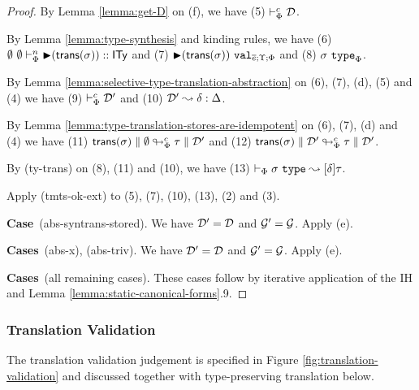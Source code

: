 \documentclass[12pt]{article}
\newcommand{\pfcase}[1]{\textbf{Case}~#1. }
\newcommand{\pfcases}[1]{\textbf{Cases}~#1. }
\begin{document}
\begin{proof}
By Lemma \ref{lemma:get-D} on (f), we have (5) $\tytsvX{\memD}$.

By Lemma \ref{lemma:type-synthesis} and kinding rules, we have (6) $\sofkVX{\sqity{\srep{\st}}}{\kity}$ and (7) $\sval{\sqity{\srep{\st}}}{\es;\Upsilon;\Phi}$ and (8) $\istype{\st}{\Phi}$.

By Lemma \ref{lemma:selective-type-translation-abstraction} on (6), (7), (d), (5) and (4) we have (9) $\tytsvX{\memD'}$ and (10) $\memD' \leadsto \delta : \Delta$.

By Lemma \ref{lemma:type-translation-stores-are-idempotent} on (6), (7), (d) and (4) we have (11) $\tdeabs{\Phi}{c}{\srep{\st}}{\emptyset}{\tau}{\memD'}$ and (12) $\tdeabs{\Phi}{c}{\srep{\st}}{\memD'}{\tau}{\memD'}$.

By (ty-trans) on (8), (11) and (10), we have (13) $\tytransX{\st}{[\delta]\tau}$.

Apply (tmts-ok-ext) to (5), (7), (10), (13), (2) and (3).

\pfcase{(abs-syntrans-stored)} We have $\memD'=\memD$ and $\memG'=\memG$. Apply (e).

\pfcases{(abs-x), (abs-triv)} We have $\memD'=\memD$ and $\memG'=\memG$. Apply (e).

\pfcases{(all remaining cases)} These cases follow by iterative application of the IH and Lemma \ref{lemma:static-canonical-forms}.9.

\end{proof}

\subsubsection{Translation Validation}
The translation validation judgement is specified in Figure \ref{fig:translation-validation} and discussed together with type-preserving translation below.
\end{document}
